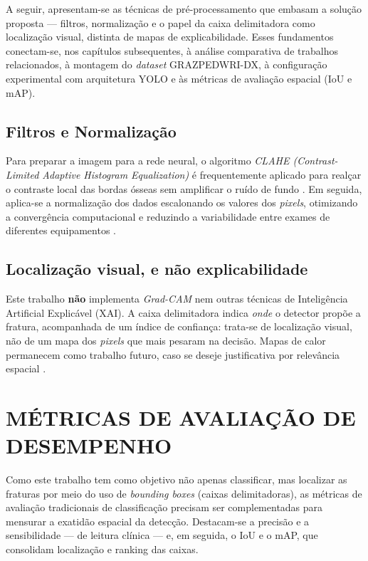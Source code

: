 \documentclass[12pt,oneside,a4paper,chapter=TITLE,section=TITLE,sumario=tradicional]{abntex2}
\begin{document}
A seguir, apresentam-se as técnicas de pré-processamento que embasam a solução proposta --- filtros, normalização e o papel da caixa delimitadora como localização visual, distinta de mapas de explicabilidade. Esses fundamentos conectam-se, nos capítulos subsequentes, à análise comparativa de trabalhos relacionados, à montagem do \textit{dataset} GRAZPEDWRI-DX, à configuração experimental com arquitetura YOLO e às métricas de avaliação espacial (IoU e mAP).

\subsection{Filtros e Normalização}

Para preparar a imagem para a rede neural, o algoritmo \textit{CLAHE (Contrast-Limited Adaptive Histogram Equalization)} é frequentemente aplicado para realçar o contraste local das bordas ósseas sem amplificar o ruído de fundo \cite{zuiderveld1994clahe,litjens2017survey}. Em seguida, aplica-se a normalização dos dados escalonando os valores dos \textit{pixels}, otimizando a convergência computacional e reduzindo a variabilidade entre exames de diferentes equipamentos \cite{litjens2017survey}.

\subsection{Localização visual, e não explicabilidade}

Este trabalho \textbf{não} implementa \textit{Grad-CAM} nem outras técnicas de Inteligência Artificial Explicável (XAI). A caixa delimitadora indica \textit{onde} o detector propõe a fratura, acompanhada de um índice de confiança: trata-se de localização visual, não de um mapa dos \textit{pixels} que mais pesaram na decisão. Mapas de calor permanecem como trabalho futuro, caso se deseje justificativa por relevância espacial \cite{viso2024}.

\section{MÉTRICAS DE AVALIAÇÃO DE DESEMPENHO}

Como este trabalho tem como objetivo não apenas classificar, mas localizar as fraturas por meio do uso de \textit{bounding boxes} (caixas delimitadoras), as métricas de avaliação tradicionais de classificação precisam ser complementadas para mensurar a exatidão espacial da detecção. Destacam-se a precisão e a sensibilidade --- de leitura clínica --- e, em seguida, o IoU e o mAP, que consolidam localização e ranking das caixas.
\end{document}

